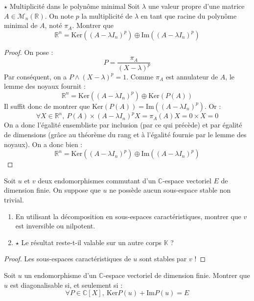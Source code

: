 \documentclass[french,a4paper]{article}
\newcommand{\R}{\mathbb{R}}
\newcommand{\C}{\mathbb{C}}
\newcommand{\K}{\mathbb{K}}
\renewcommand{\ker}{\text{Ker}}
\newcommand{\im}{\text{Im}}
\theoremstyle{plain}
\theoremstyle{definition}
\theoremstyle{remark}
\begin{document}
\begin{ex}{$\star$ Multiplicité dans le polynôme minimal}
	Soit $\lambda$ une valeur propre d'une matrice $A\in\mathcal{M}_n(\R)$. On note $p$ la multiplicité de $\lambda$ en tant que racine du polynôme minimal de $A$, noté $\pi_A$. Montrer que $$\R^n=\ker((A-\lambda I_n)^p)\oplus\im((A-\lambda I_n)^p)$$ 
\end{ex}
\begin{proof}
	On pose : $$P=\frac{\pi_A}{(X-\lambda)^p}$$ Par conséquent, on a $P\wedge(X-\lambda)^p=1$. Comme $\pi_A$ est annulateur de $A$, le lemme des noyaux fournit : $$\R^n=\ker((A-\lambda I_n)^p)\oplus\ker(P(A))$$ Il suffit donc de montrer que $\ker(P(A))=\im((A-\lambda I_n)^p)$. Or : $$\forall X\in\R^n,\ P(A)\times(A-\lambda I_n)^pX=\pi_A(A)X=0\times X=0$$ On a donc l'égalité ensembliste par inclusion (par ce qui précède) et par égalité de dimensions (grâce au théorème du rang et à l'égalité fournie par le lemme des noyaux). On a donc bien :$$\R^n=\ker((A-\lambda I_n)^p)\oplus\im((A-\lambda I_n)^p)$$ 
\end{proof}

\begin{ex}{}
	Soit $u$ et $v$ deux endomorphismes commutant d'un $\C$-espace vectoriel $E$ de dimension finie. On suppose que $u$ ne possède aucun sous-espace stable non trivial.
	\begin{enumerate}
		\item En utilisant la décomposition en sous-espaces caractéristiques, montrer que $v$ est inversible ou nilpotent.
		\item $\star$ Le résultat reste-t-il valable sur un autre corps $\K$ ?
	\end{enumerate}
\end{ex}
\begin{proof}
	Les sous-espaces caractéristiques de $u$ sont stables par $v$ !
\end{proof}

\begin{ex}{}
	Soit $u$ un endomorphisme d'un $\C$-espace vectoriel de dimension finie. Montrer que $u$ est diagonalisable si, et seulement si : $$\forall P\in\C[X],\ \ker P(u)+\text{Im}P(u)=E$$
\end{ex}
\end{document}
